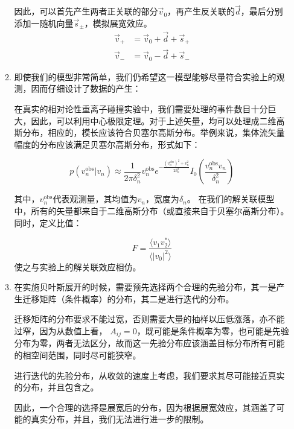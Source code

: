 \documentclass[aps,pre,12pt,preprint,onecolumn,showpacs,showkeys]{revtex4-1}
\begin{document}
\begin{enumerate}
\begin{enumerate}
        因此，可以首先产生两者正关联的部分$\vec{v}_0$，再产生反关联的$\vec{d}$，最后分别添加一随机向量$\vec{s}_\pm$，模拟展宽效应。
        \begin{equation}
            \begin{aligned}
                \vec{v}_+&=\vec{v}_0+\vec{d}+\vec{s}_+\\
                \vec{v}_-&=\vec{v}_0-\vec{d}+\vec{s}_-
            \end{aligned}
        \end{equation}
        \item 即使我们的模型非常简单，我们仍希望这一模型能够尽量符合实验上的观测，因而仔细设计了数据的产生：\par
        在真实的相对论性重离子碰撞实验中，我们需要处理的事件数目十分巨大，因此，可以利用中心极限定理。对于上述矢量，均可以处理成二维高斯分布，相应的，模长应该符合贝塞尔高斯分布。举例来说，集体流矢量幅度的分布应该满足贝塞尔高斯分布，形式如下：\par
        \begin{equation}
            p\left(v_{n}^{\mathrm{obs}} | v_{n}\right) \approx \frac{1}{2 \pi \delta_{n}^{2}} v_{n}^{\mathrm{obs}} e^{-\frac{\left(v_{n}^{\mathrm{obs}}\right)^{2}+v_{n}^{2}}{2 \delta_{n}^{2}}} I_{0}\left(\frac{v_{n}^{\mathrm{obs}} v_{n}}{\delta_{n}^{2}}\right)
        \end{equation}
        \par
        其中，$v_{n}^{\mathrm{obs}}$代表观测量，其均值为$v_n$，宽度为$\delta_n$。
        在我们的解关联模型中，所有的矢量都来自于二维高斯分布（或直接来自于贝塞尔高斯分布）。同时，定义比值：\par
        \begin{equation}
            F=\frac{\langle v_1v_2^*\rangle}{\langle|v_0|^2\rangle}
        \end{equation}
        使之与实验上的解关联效应相仿。
        \item 在实施贝叶斯展开的时候，需要预先选择两个合理的先验分布，其一是产生迁移矩阵（条件概率）的分布，其二是进行迭代的分布。\par
        迁移矩阵的分布要求不能过宽，否则需要大量的抽样以压低涨落，亦不能过窄，因为从数值上看，
        $A_{ij}=0$，既可能是条件概率为零，也可能是先验分布为零，两者无法区分，故而这一先验分布应该涵盖目标分布所有可能的相空间范围，同时尽可能狭窄。\par
        进行迭代的先验分布，从收敛的速度上考虑，我们要求其尽可能接近真实的分布，并且包含之。\par
        因此，一个合理的选择是展宽后的分布，因为根据展宽效应，其涵盖了可能的真实分布，并且，我们无法进行进一步的限制。

\end{enumerate}
\end{enumerate}
\end{document}
